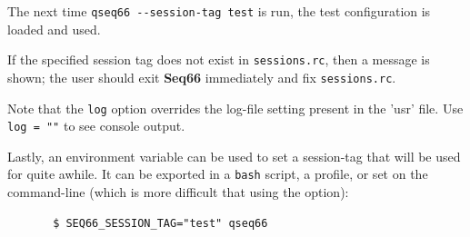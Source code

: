    The next time 
   \texttt{qseq66 -{}-session-tag test}
   is run, the test configuration is loaded and used.

   If the specified session tag does not exist in \texttt{sessions.rc},
   then a message is shown; the user should exit \textbf{Seq66} immediately
   and fix \texttt{sessions.rc}.

   Note that the \texttt{log} option overrides the log-file setting
   present in the 'usr' file. Use \texttt{log = ""} to see console output.

   Lastly, an environment variable can be used to set a session-tag that
   will be used for quite awhile.
   It can be exported in a \texttt{bash} script, a profile,
   or set on the command-line (which is more difficult that using the
   option):

   \begin{verbatim}
       $ SEQ66_SESSION_TAG="test" qseq66
   \end{verbatim}


